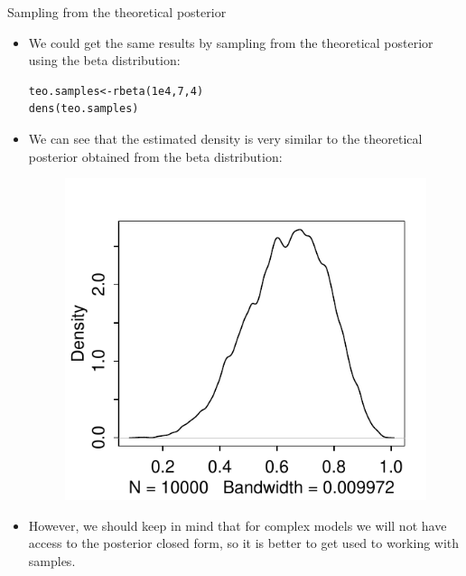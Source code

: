 \documentclass[handout]{beamer}
\begin{document}
\begin{frame}[fragile]{Sampling from the theoretical posterior}
\scriptsize{
\begin{itemize}

\item We could get the same results by sampling from the theoretical posterior using the beta distribution: 

\begin{verbatim}
teo.samples<-rbeta(1e4,7,4)
dens(teo.samples)
\end{verbatim}



\item We can see that the estimated density is very similar to the theoretical posterior obtained from the beta distribution:


   \begin{figure}[h!]
	\centering
	\includegraphics[scale=0.6]{pics/posteriorTossBeta.pdf}
	\end{figure} 


	\item However, we should keep in mind that for complex models we will not have access to the posterior closed form, so it is better to get used to working with samples.
\end{itemize}



} 

\end{frame}
\end{document}
